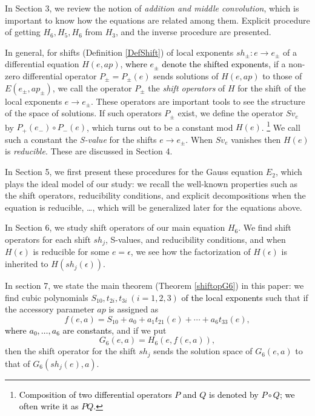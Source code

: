 \documentclass[a4paper,12pt]{article}
\theoremstyle{definition}
\theoremstyle{remark}
\numberwithin{equation}{section} %
\newcommand{\blue}[1]{\textcolor{black}{#1}}
\begin{document}
In Section 3, we review the notion of {\sl addition and  middle convolution}, which is important to know how the equations are related among them. Explicit procedure of getting $H_6,H_5,H_6$ from $H_3$, and the inverse procedure are presented.
\par\smallskip\noindent

In general, for  shifts (Definition \ref{DefShift}) of local exponents $sh_\pm: e\to e_\pm$ of a differential equation $H(e,ap)$, \blue{where $e_\pm$ denote the shifted exponents,} 
if a non-zero differential operator $P_{\pm}=P_{\pm}(e)$ sends solutions of $H(e,ap)$
to those of $E(e_\pm,ap_\pm)$, we call the operator $P_{\pm}$ the {\it shift operators}
of $H$ for the shift of the local exponents $e\to e_\pm$. 
These operators are important tools to see the structure of the space
of solutions. If such operators $P_{\pm}$ exist, we define the operator
$Sv_{e}$ by $P_+(e_-)\circ P_-(e)$, which turns out to be a constant mod $H(e)$. \footnote{\blue{Composition of two differential operators $P$ and $Q$ is
  denoted by $P\circ Q$; we often  write it as $PQ$.}}
We call such a constant the {\it S-value} for the shifts $e\to e_\pm$.
%
When $Sv_{e}$ vanishes then $H(e)$ is {\it reducible}. These are discussed in Section 4.
\par\smallskip


In Section 5, we first present these procedures for 
the Gauss equation $E_2$, which plays the ideal model of our study:
we recall the well-known properties such as the shift operators, reducibility conditions,
and explicit decompositions when the equation is reducible, \dots,
which will be generalized later for the equations above.

\par\smallskip
In Section 6, we study shift operators of our main equation $H_6$.
We find shift operators for each shift $sh_j$, S-values, and reducibility conditions,
and when $H(\epsilon)$ is reducible for some $e=\epsilon$, we see how the factorization of $H(\epsilon)$ is inherited to $H(sh_j(\epsilon))$.

\par\smallskip
In section 7, we state the main theorem (Theorem \ref{shiftopG6}) in this paper: we find cubic polynomials $S_{10}, t_{2i}, t_{3i}\ (i=1,2,3)$ \blue{of the local exponents} such that if the accessory parameter $ap$ is assigned as
$$f(e,a)=S_{10}+a_0+a_1t_{21}(e)+\cdots+a_6t_{33}(e),$$
\blue{where $a_0,\dots,a_6$ are constants,} and if we put
$$G_6(e,a)=H_6(e,f(e,a)),$$
then the shift operator for the shift $sh_j$ sends the solution space of $G_6(e,a)$ to that of $G_6(sh_j(e),a)$.
\end{document}
